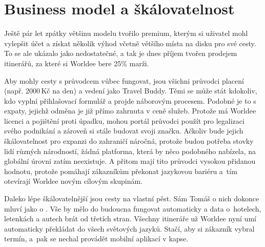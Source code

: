 \section{Business model a škálovatelnost}

Ještě pár let zpátky většinu modelu tvořilo premium, kterým si uživatel mohl vylepšit účet a získat několik výhod včetně většího místa na disku pro své cesty. To se ale ukázalo jako nedostatečné, a tak je dnes příjem tvořen prodejem itinerářů, za které si Worldee bere 25\% marži.

Aby mohly cesty s průvodcem vůbec fungovat, jsou všichni průvodci placení (např. 2000\,Kč na den) a vedení jako Travel Buddy. Těmi se může stát kdokoliv, kdo vyplní přihlašovací formulář a projde náborovým procesem. Podobné je to s expaty, jejichž odměna je již přímo zahrnuta v ceně služeb. Protože má Worldee licenci a pojištění proti úpadku, mohou portál průvodci použít pro legalizaci svého podnikání a zároveň si stále budovat svoji značku. Ačkoliv bude jejich škálovatelnost pro expanzi do zahraničí náročná, protože budou potřeba stovky lidí různých národností, žádná platforma, která by něco podobného nabízela, na globální úrovni zatím neexistuje. A přitom mají tito průvodci vysokou přidanou hodnotu, protože pomáhají zákazníkům překonat jazykovou bariéru a~tím otevírají Worldee novým cílovým skupinám.

Daleko lépe škálovatelnější jsou cesty na vlastní pěst. Sám Tomáš o nich dokonce mluví jako o . Vše by mělo do budoucna fungovat automaticky a data o~hotelech, letenkách a autech brát od třetích stran. Všechny itineráře už Worldee nyní umí automaticky překládat do všech světových jazyků. Stačí, aby si zákazník vybral termín, a~pak se nechal provádět mobilní aplikací v kapse.
